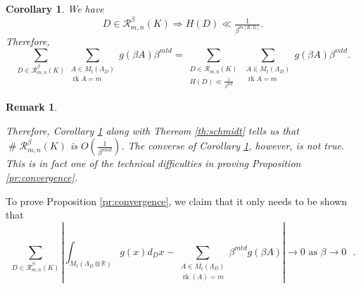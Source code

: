 \documentclass{amsart}
\newtheorem{corollary}[theorem]{Corollary}
\newtheorem{remark}[theorem]{Remark}
\newcommand{\OK}{\mathcal{O}_K}
\DeclareMathOperator{\card}{\texttt{\#}}
\DeclareMathOperator{\rank}{rk}
\begin{document}
\begin{corollary}
We have 
\begin{equation}
	D \in \mathcal{R}^{\beta}_{m,n}(K) \Rightarrow H(D) \ll \tfrac{1}{\beta^{m[K:\mathbb{Q}]}}.
\end{equation}
Therefore, 
\begin{equation}
  \sum_{D \in  \mathcal{R}^{\beta}_{m,n}(K)} \sum_{\substack{A \in M_{t}(\Lambda_D)   \\ \rank A = m  }} g(\beta A )  \beta^{mtd} = 
  \sum_{\substack{D \in \mathcal{R}_{m,n}(K)   \\  H(D) \ll \frac{1}{\beta^{md}}}} \sum_{\substack{A \in M_{t}(\Lambda_D)   \\ \rank A = m  }} g(\beta A )  \beta^{mtd}.
\end{equation}
\label{co:calprime_bounded}
\end{corollary}

\begin{remark}
\label{re:necessary_not_sufficient}

Therefore, Corollary \ref{co:calprime_bounded} along with Thereom \ref{th:schmidt} 
tells us that  $\card \mathcal{R}_{m,n}^{\beta}(K)$ is $O(\frac{1}{\beta^{mnd}})$. The converse of Corollary \ref{co:calprime_bounded},
however, is not true. This is in fact one of the technical difficulties in proving Proposition \ref{pr:convergence}.
\end{remark}



To prove Proposition \ref{pr:convergence}, 
we claim that it only needs to be shown that 
\begin{equation}
\label{eq:terms_to_focus_on}
	\sum_{D \in \mathcal{R}^{\beta}_{m,n}(K)}
	\left| \int_{M_t(\Lambda_D \otimes \mathbb{R})} g(x)d_{D}x  - \sum_{\substack{A \in M_t(\Lambda_D) \\ \rank(A) = m}}  \beta^{mtd}g(\beta A) \right|  \rightarrow 0  \text{ as $\beta \rightarrow 0$ }.  
\end{equation}
\end{document}
